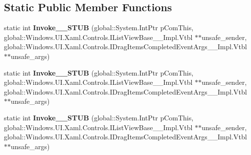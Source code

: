 \subsection*{Static Public Member Functions}
\begin{DoxyCompactItemize}
\item 
\mbox{\label{struct_windows_1_1_foundation_1_1_typed_event_handler___a___windows___u_i___xaml___controls___li15051749ac89515b728f66d306810c20_a696b402ddea4349cabd3ea59ba1e236a}} 
static int {\bfseries Invoke\+\_\+\+\_\+\+S\+T\+UB} (global\+::\+System.\+Int\+Ptr p\+Com\+This, global\+::\+Windows.\+U\+I.\+Xaml.\+Controls.\+I\+List\+View\+Base\+\_\+\+\_\+\+Impl.\+Vtbl $\ast$$\ast$unsafe\+\_\+sender, global\+::\+Windows.\+U\+I.\+Xaml.\+Controls.\+I\+Drag\+Items\+Completed\+Event\+Args\+\_\+\+\_\+\+Impl.\+Vtbl $\ast$$\ast$unsafe\+\_\+args)
\item 
\mbox{\label{struct_windows_1_1_foundation_1_1_typed_event_handler___a___windows___u_i___xaml___controls___li15051749ac89515b728f66d306810c20_a696b402ddea4349cabd3ea59ba1e236a}} 
static int {\bfseries Invoke\+\_\+\+\_\+\+S\+T\+UB} (global\+::\+System.\+Int\+Ptr p\+Com\+This, global\+::\+Windows.\+U\+I.\+Xaml.\+Controls.\+I\+List\+View\+Base\+\_\+\+\_\+\+Impl.\+Vtbl $\ast$$\ast$unsafe\+\_\+sender, global\+::\+Windows.\+U\+I.\+Xaml.\+Controls.\+I\+Drag\+Items\+Completed\+Event\+Args\+\_\+\+\_\+\+Impl.\+Vtbl $\ast$$\ast$unsafe\+\_\+args)
\item 
\mbox{\label{struct_windows_1_1_foundation_1_1_typed_event_handler___a___windows___u_i___xaml___controls___li15051749ac89515b728f66d306810c20_a696b402ddea4349cabd3ea59ba1e236a}} 
static int {\bfseries Invoke\+\_\+\+\_\+\+S\+T\+UB} (global\+::\+System.\+Int\+Ptr p\+Com\+This, global\+::\+Windows.\+U\+I.\+Xaml.\+Controls.\+I\+List\+View\+Base\+\_\+\+\_\+\+Impl.\+Vtbl $\ast$$\ast$unsafe\+\_\+sender, global\+::\+Windows.\+U\+I.\+Xaml.\+Controls.\+I\+Drag\+Items\+Completed\+Event\+Args\+\_\+\+\_\+\+Impl.\+Vtbl $\ast$$\ast$unsafe\+\_\+args)
\item 

\end{DoxyCompactItemize}
